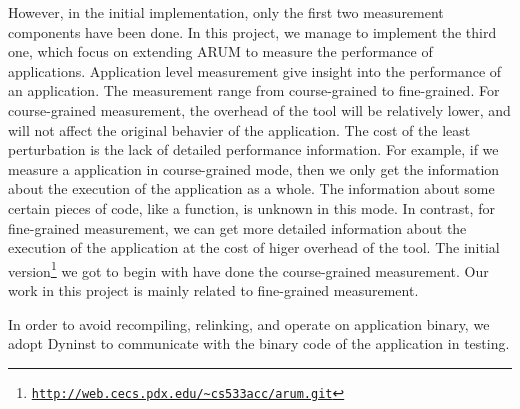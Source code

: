 \documentclass[11pt,letterpaper,oneside]{article}
\begin{document}
However, in the initial implementation, only the first two measurement components have been done. In this project, we manage to implement the third one, which focus on extending ARUM to measure the performance of applications. Application level measurement give insight into the performance of an application. The measurement range from course-grained to fine-grained. For course-grained measurement, the overhead of the tool will be relatively lower, and will not affect the original behavier of the application. The cost of the least perturbation is the lack of detailed performance information. For example, if we measure a application in course-grained mode, then we only get the information about the execution of the application as a whole. The information about some certain pieces of code, like a function, is unknown in this mode. In contrast, for fine-grained measurement, we can get more detailed information about the execution of the application at the cost of higer overhead of the tool. The initial version\footnote{\texttt{\url{http://web.cecs.pdx.edu/~cs533acc/arum.git}}} we got to begin with have done the course-grained measurement. Our work in this project is mainly related to fine-grained measurement.

In order to avoid recompiling, relinking, and operate on application binary, we adopt Dyninst \cite{bib:dyninstweb} to communicate with the binary code of the application in testing.
\end{document}
